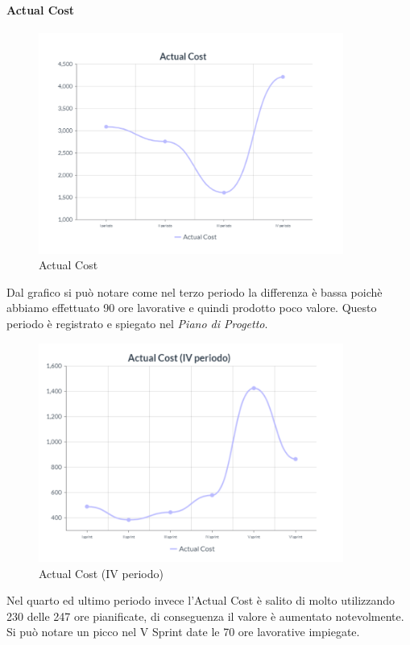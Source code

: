 \paragraph{Actual Cost}
\begin{center}
\begin{figure}[H]
  \centering
  \renewcommand{\thefigure}{3}
  \includegraphics[width=10cm]{./res/images/ACGraph.png}
  \caption{Actual Cost}
  \label{fig:Grafico Actual Cost}
\end{figure}
\end{center}
Dal grafico si può notare come nel terzo periodo la differenza è bassa poichè abbiamo effettuato 90 ore lavorative e quindi prodotto poco valore. Questo periodo è registrato e spiegato nel \textit{Piano di Progetto}.
\begin{center}
\begin{figure}[H]
  \centering
  \renewcommand{\thefigure}{4}
  \includegraphics[width=10cm]{./res/images/ACGraphSprint.png}
  \caption{Actual Cost (IV periodo)}
  \label{fig:Grafico Actual Cost (IV periodo)}
\end{figure}
\end{center}
Nel quarto ed ultimo periodo invece l'Actual Cost è salito di molto utilizzando 230 delle 247 ore pianificate, di conseguenza il valore è aumentato notevolmente.\\
Si può notare un picco nel V Sprint date le 70 ore lavorative impiegate.
